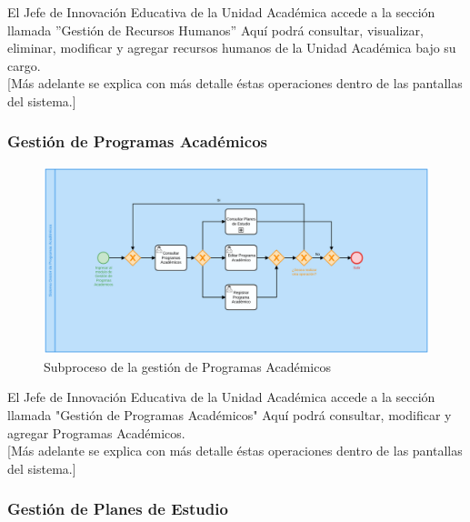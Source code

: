         El Jefe de Innovación Educativa de la Unidad Académica accede a la sección llamada ''Gestión de Recursos Humanos'' Aquí podrá consultar, visualizar, eliminar, modificar y agregar recursos humanos de la Unidad Académica bajo su cargo. \\

        [Más adelante se explica con más detalle éstas operaciones dentro de las pantallas del sistema.]\\
        \newpage
        \subsubsection{Gestión de Programas Académicos}

        \begin{figure}[!hbtp]
            \centering
            \hypertarget{BPMNGPA}{\includegraphics[width=\linewidth]{images/SP3/gestionPA.png}}
            \caption{Subproceso de la gestión de Programas Académicos}
            \label{BPMNGPA}
        \end{figure}

        El Jefe de Innovación Educativa de la Unidad Académica accede a la sección llamada "Gestión de Programas Académicos" Aquí podrá consultar, modificar y agregar Programas Académicos. \\

        [Más adelante se explica con más detalle éstas operaciones dentro de las pantallas del sistema.]\\
        \newpage
        \subsubsection{Gestión de Planes de Estudio}

